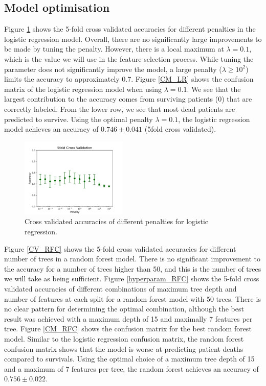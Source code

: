 \documentclass[notitlepage, reprint, nofootinbib]{revtex4-1}
\begin{document}
\subsection{Model optimisation}
Figure \ref{CV_LR} shows the 5-fold cross validated accuracies for different penalties in the logistic regression model. Overall, there are no significantly large improvements to be made by tuning the penalty. However, there is a local maximum at $\lambda=0.1$, which is the value we will use in the feature selection process. While tuning the parameter does not significantly improve the model, a large penalty ($\lambda \geq 10^2$) limits the accuracy to approximately 0.7. Figure \ref{CM_LR} shows the confusion matrix of the logistic regression model when using $\lambda=0.1$. We see that the largest contribution to the accuracy comes from surviving patients (0) that are correctly labeled. From the lower row, we see that most dead patients are predicted to survive. Using the optimal penalty $\lambda=0.1$, the logistic regression model achieves an accuracy of $0.746\pm0.041$ (5fold cross validated). \\[2mm]
\begin{figure}[b]
	\centering
	\includegraphics[width=0.45\textwidth]{../Figures/5fold_CV_LR_penalties.png}
	\caption{Cross validated accuracies of different penalties for logistic regression. }
	\label{CV_LR}
\end{figure}
\newpage
Figure \ref{CV_RFC} shows the 5-fold cross validated accuracies for different number of trees in a random forest model. There is no significant improvement to the accuracy for a number of trees higher than 50, and this is the number of trees we will take as being sufficient. Figure \ref{hyperparam_RFC} shows the 5-fold cross validated accuracies of different combinations of maximum tree depth and number of features at each split for a random forest model with 50 trees. There is no clear pattern for determining the optimal combination, although the best result was achieved with a maximum depth of 15 and maximally 7 features per tree. Figure \ref{CM_RFC} shows the confusion matrix for the best random forest model. Similar to the logistic regression confusion matrix, the random forest confusion matrix shows that the model is worse at predicting patient deaths compared to survivals. Using the optimal choice of a maximum tree depth of 15 and a maximum of 7 features per tree, the random forest achieves an accuracy of $0.756\pm0.022$.
\end{document}
